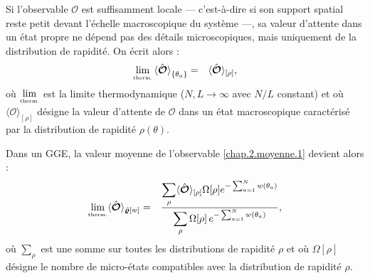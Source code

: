 \vspace{0.5em}
\medskip


Si l’observable \(\mathcal{O}\) est suffisamment locale — c’est-à-dire si son support spatial reste petit devant l’échelle macroscopique du système —, sa valeur d’attente dans un état propre ne dépend pas des détails microscopiques, mais uniquement de la distribution de rapidité. On écrit alors :
\begin{eqnarray}
    \underset{\mbox{\tiny therm.}}{\lim} \braket{  \hat{\bm{\mathcal{O}}} }_{\{ \theta_a\}}  & = & \langle \hat{\bm{\mathcal{O}}}\rangle_{[\rho]},
\end{eqnarray}
où \(\underset{\mbox{\tiny therm.}}{\lim}\) est la limite thermodynamique ($N,L \to \infty$ avec $N/L$ constant) et où \( \langle \mathcal{O} \rangle_{[\rho]} \) désigne la valeur d’attente de \( \mathcal{O} \) dans un état macroscopique caractérisé par la distribution de rapidité \( \rho(\theta) \).



\medskip
Dans un \gls{GGE}, la valeur moyenne de l’observable \eqref{chap.2.moyenne.1} devient alors :		
\begin{eqnarray}\label{chap.2.moyenne.2}
	\underset{\mbox{\tiny therm.}}{\lim} \langle \hat{\bm{\mathcal{O}}} \rangle_{\hat{\bm{\varrho}}[w]} & =  & \frac{  \displaystyle \sum_{\rho }  \langle \hat{\bm{\mathcal{O}}}\rangle_{[\rho]} \Omega[\rho] e^{- \sum_{a = 1}^N  w(\theta_a)    }}{ \displaystyle \sum_{\rho}   \Omega[\rho]\,e^{- \sum_{a = 1}^N  w(\theta_a) } } ,
\end{eqnarray}
où $\sum_{\rho }$ est une somme sur toutes les distributions de rapidité $\rho$ et où $\Omega[\rho]$ désigne le nombre de micro-états compatibles avec la distribution de rapidité $\rho$.

